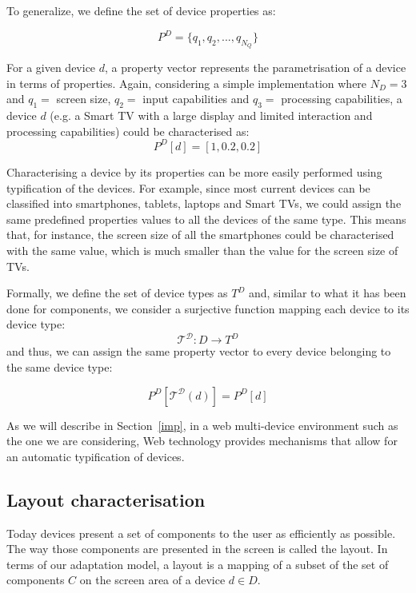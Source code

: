 To generalize, we define the set of device properties as:

\begin{equation}
P^D= \{ q_1, q_2, ..., q_{N_Q} \}
\end{equation}

For a given device $d$, a property vector represents the parametrisation of a device in terms of properties.
Again, considering a simple implementation where $N_D=3$ and $q_1=$ screen size, $q_2=$ input capabilities and $q_3=$ processing capabilities, a device $d$ (e.g. a Smart TV with a large display and limited interaction and processing capabilities) could be characterised as:
\begin{equation}
P^D[d]=[1, 0.2, 0.2]
\end{equation}

Characterising a device by its properties can be more easily performed using typification of the devices. For example, since most current devices can be classified into smartphones, tablets, laptops and Smart TVs, we could assign the same predefined properties values to all the devices of the same type. 
This means that, for instance, the screen size of all the smartphones could be characterised with the same value, which is much smaller than the value for the screen size of TVs.

Formally, we define the set of device types as $T^D$ and, similar to what it has been done for components, we consider a surjective function mapping each device to its device type: 
\begin{equation}
\mathcal{T^D}:D \to T^D  
\end{equation}
and thus, we can assign the same property vector to every device belonging to the same device type:

\begin{equation}
P^D[\mathcal{T^D}(d)] = P^D[d]
\end{equation}

As we will describe in Section~\ref{imp}, in a web multi-device environment such as the one we are considering, Web technology provides mechanisms that allow for an automatic typification of devices. 


\subsection{Layout characterisation}\label{layouts}

Today devices present a set of components to the user as efficiently as possible. 
The way those components are presented in the screen is called the layout. 
In terms of our adaptation model, a layout is a mapping of a subset of the set of components $C$ on the screen area of a device $d \in D$.

